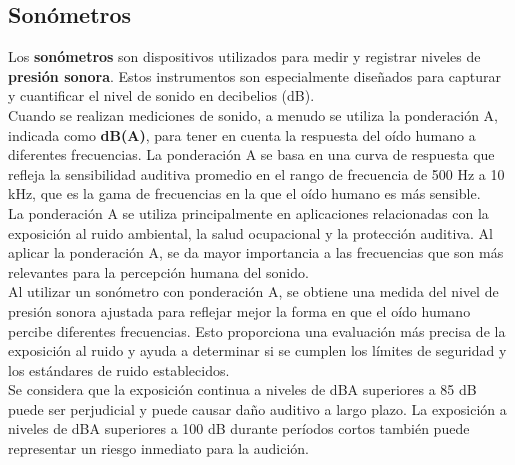 \documentclass[
	12pt, %
	fleqn, %
	a4paper, %
	oneside, %
]{LegrandOrangeBook}
\begin{document}
\subsection{Sonómetros}
Los \textbf{sonómetros} son dispositivos utilizados para medir y registrar niveles de \textbf{presión sonora}. Estos instrumentos son especialmente diseñados para capturar y cuantificar el nivel de sonido en decibelios (dB).\\
Cuando se realizan mediciones de sonido, a menudo se utiliza la ponderación A, indicada como \textbf{dB(A)}, para tener en cuenta la respuesta del oído humano a diferentes frecuencias. La ponderación A se basa en una curva de respuesta que refleja la sensibilidad auditiva promedio en el rango de frecuencia de 500 Hz a 10 kHz, que es la gama de frecuencias en la que el oído humano es más sensible.\\
La ponderación A se utiliza principalmente en aplicaciones relacionadas con la exposición al ruido ambiental, la salud ocupacional y la protección auditiva. Al aplicar la ponderación A, se da mayor importancia a las frecuencias que son más relevantes para la percepción humana del sonido.\\
Al utilizar un sonómetro con ponderación A, se obtiene una medida del nivel de presión sonora ajustada para reflejar mejor la forma en que el oído humano percibe diferentes frecuencias. Esto proporciona una evaluación más precisa de la exposición al ruido y ayuda a determinar si se cumplen los límites de seguridad y los estándares de ruido establecidos.\\
Se considera que la exposición continua a niveles de dBA superiores a 85 dB puede ser perjudicial y puede causar daño auditivo a largo plazo. La exposición a niveles de dBA superiores a 100 dB durante períodos cortos también puede representar un riesgo inmediato para la audición.
\end{document}
